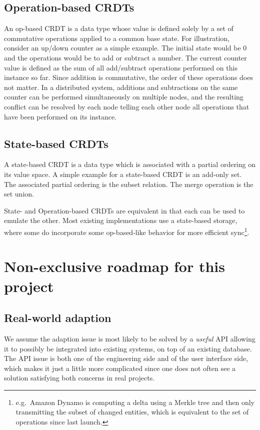 \documentclass[12pt,a4paper,notitlepage]{article}
\begin{document}
\subsection{Operation-based CRDTs}
An op-based CRDT is a data type whose value is defined solely by a set of commutative operations applied to a common
base state. For illustration, consider an up/down counter as a simple example. The initial state would be $0$ and the
operations would be to add or subtract a number. The current counter value is defined as the sum of all add/subtract
operations performed on this instance so far. Since addition is commutative, the order of these operations does not
matter. In a distributed system, additions and subtractions on the same counter can be performed simultaneously on
multiple nodes, and the resulting conflict can be resolved by each node telling each other node all operations that have
been performed on its instance.

\subsection{State-based CRDTs}
A state-based CRDT is a data type which is associated with a partial ordering on its value space. A simple example for a
state-based CRDT is an add-only set. The associated partial ordering is the subset relation. The merge operation is the
set union.

State- and Operation-based CRDTs are equivalent in that each can be used to emulate the other. Most existing
implementations use a state-based storage, where some do incorporate some op-based-like behavior %
for more efficient sync\footnote{e.g.\ Amazon Dynamo is computing a delta using a Merkle tree and then only transmitting
the subset of changed entities, which is equivalent to the set of operations since last launch.}.

\section{Non-exclusive roadmap for this project}
\subsection{Real-world adaption}
We assume the adaption issue is most likely to be solved by a \emph{useful} API allowing it to possibly be integrated
into existing systems, on top of an existing database. The API issue is both one of the engineering side and of the user
interface side, which makes it just a little more complicated since one does not often see a solution satisfying both
concerns in real projects.
\end{document}

